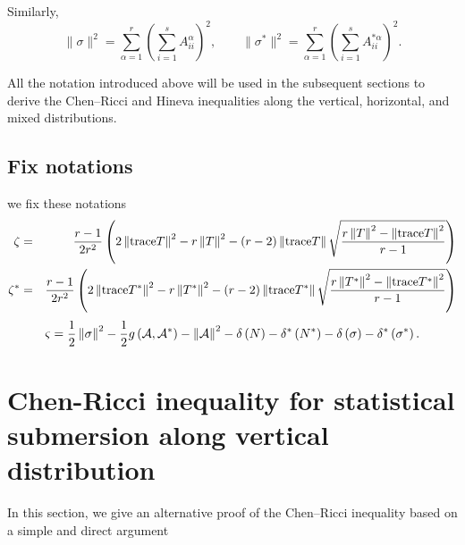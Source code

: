 \documentclass[10pt,a4paper]{article}
\theoremstyle{definition}
\theoremstyle{remark}
\numberwithin{equation}{section}
\begin{document}
Similarly,
\begin{equation}
\|\sigma\|^{2}
=
\sum_{\alpha=1}^{r}
\left(
\sum_{i=1}^{s}A_{ii}^{\alpha}
\right)^{2},
\qquad
\|\sigma^{*}\|^{2}
=
\sum_{\alpha=1}^{r}
\left(
\sum_{i=1}^{s}A_{ii}^{*\alpha}
\right)^{2}.
\label{eq-sigma-norm-final}
\end{equation}

All the notation introduced above will be used in the subsequent sections
to derive the Chen--Ricci and Hineva inequalities along the vertical,
horizontal, and mixed distributions.

\subsection{Fix notations}
we fix these notations%
\begin{eqnarray*}
\zeta  &=&\frac{r-1}{2r^{2}}\left( 2\left\Vert {\rm trace}T\right\Vert
^{2}-r\left\Vert T\right\Vert ^{2}-\left( r-2\right) \left\Vert {\rm trace}%
T\right\Vert \sqrt{\frac{r\left\Vert T\right\Vert ^{2}-\left\Vert {\rm trace}%
T\right\Vert ^{2}}{r-1}}\right)  \\
\zeta ^{\ast } &=&\frac{r-1}{2r^{2}}\left( 2\left\Vert {\rm trace}T^{\ast
}\right\Vert ^{2}-r\left\Vert T^{\ast }\right\Vert ^{2}-\left( r-2\right)
\left\Vert {\rm trace}T^{\ast }\right\Vert \sqrt{\frac{r\left\Vert T^{\ast
}\right\Vert ^{2}-\left\Vert {\rm trace}T^{\ast }\right\Vert ^{2}}{r-1}}%
\right) 
\end{eqnarray*}%
\[
\varsigma =\frac{1}{2}\left\Vert \sigma \right\Vert ^{2}-\frac{1}{2}g\left( 
{\cal A},{\cal A}^{\ast }\right) -\left\Vert {\cal A}\right\Vert ^{2}-\delta
\left( N\right) -\delta ^{\ast }\left( N^{\ast }\right) -\delta \left(
\sigma \right) -\delta ^{\ast }\left( \sigma ^{\ast }\right) .
\]


\section{Chen-Ricci inequality for statistical submersion along vertical distribution}

In this section, we give an alternative proof of the Chen–Ricci inequality based on a simple and direct argument
\end{document}
